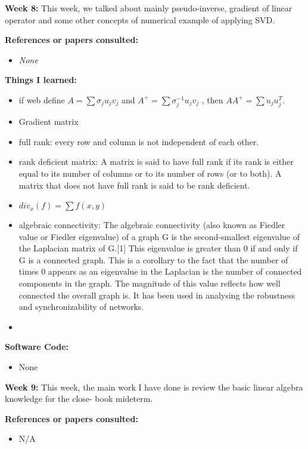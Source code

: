 \documentclass{article}
\begin{document}
\newpage
\textbf{Week 8:}
This week, we talked about mainly pseudo-inverse, gradient of linear operator and some other concepts of numerical example of applying SVD. 

\textbf{References or papers consulted:}
\begin{itemize}

\item {\em None}

\end{itemize}

\textbf{Things I learned:}
\begin{itemize}
\item if web define $A = \sum \sigma_j u_j v_j$ and $A^+ = \sum \sigma_j^{-1} u_j v_j$ , then $AA^+ = \sum u_j u_j^T$.
\item Gradient matrix
\item full rank: every row and column is not independent of each other. 
\item rank deficient matrix: A matrix is said to have full rank if its rank is either equal to its number of columns or to its number of rows (or to both). A matrix that does not have full rank is said to be rank deficient.
\item $div_x(f) = \sum f(x,y)$
\item algebraic connectivity: The algebraic connectivity (also known as Fiedler value or Fiedler eigenvalue) of a graph G is the second-smallest eigenvalue of the Laplacian matrix of G.[1] This eigenvalue is greater than 0 if and only if G is a connected graph. This is a corollary to the fact that the number of times 0 appears as an eigenvalue in the Laplacian is the number of connected components in the graph. The magnitude of this value reflects how well connected the overall graph is. It has been used in analysing the robustness and synchronizability of networks.
\item 
\end{itemize}

\textbf{Software Code:}
\begin{itemize}
\item None
\end{itemize}


\newpage
\textbf{Week 9:}
This week, the main work I have done is review the basic linear algebra knowledge for the close- book mideterm.

\textbf{References or papers consulted:}
\begin{itemize}

\item N/A

\end{itemize}
\end{document}
